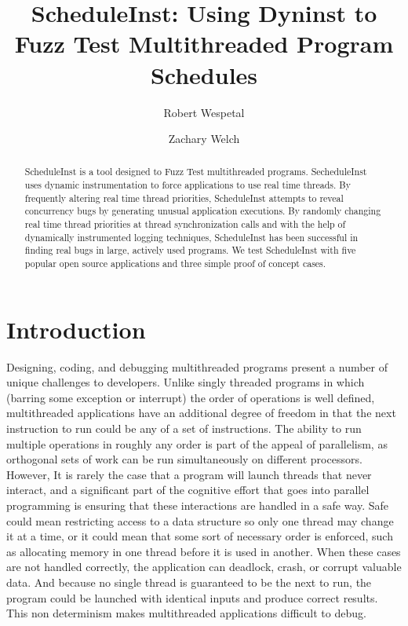 \documentclass[10pt,]{article} %
\title{ScheduleInst: Using Dyninst to Fuzz Test Multithreaded Program Schedules}
\author{Robert Wespetal\\
\and
Zachary Welch}
\begin{document}
\setlength{\baselineskip}{18pt}

\maketitle

\begin{abstract}
\setlength{\baselineskip}{18pt}
ScheduleInst is a tool designed to Fuzz Test multithreaded programs.  SecheduleInst uses dynamic instrumentation to force applications to use real time threads.  By frequently altering real time thread priorities, ScheduleInst attempts to reveal concurrency bugs by generating unusual application executions. By randomly changing real time thread priorities at thread synchronization calls and with the help of dynamically instrumented logging techniques, ScheduleInst has been successful in finding real bugs in large, actively used programs. We test ScheduleInst with five popular open source applications and three simple proof of concept cases.      

 \end{abstract}


\section{Introduction}

Designing, coding, and debugging multithreaded programs present a number of unique challenges to developers. Unlike singly threaded programs in which (barring some exception or interrupt) the order of operations is well defined, multithreaded applications have an additional degree of freedom in that the next instruction to run could be any of a set of instructions.  The ability to run multiple operations in roughly any order is part of the appeal of parallelism, as orthogonal sets of work can be run simultaneously on different processors.  However, It is rarely the case that a program will launch threads that never interact, and a significant part of the cognitive effort that goes into parallel programming is ensuring that these interactions are handled in a safe way. Safe could mean restricting access to a data structure so only one thread may change it at a time, or it could mean that some sort of necessary order is enforced, such as allocating memory in one thread before it is used in another.  When these cases are not handled correctly, the application can deadlock, crash, or corrupt valuable data.  And because no single thread is guaranteed to be the next to run, the program could be launched with identical  inputs and produce correct results.  This non determinism makes multithreaded applications difficult to debug.
\end{document}
